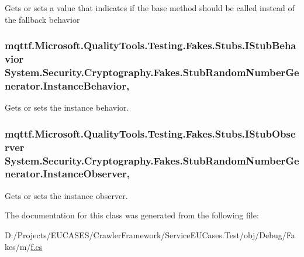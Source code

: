 Gets or sets a value that indicates if the base method should be called instead of the fallback behavior

\hypertarget{class_system_1_1_security_1_1_cryptography_1_1_fakes_1_1_stub_random_number_generator_aa175c81914f39e1bf90dbd521db4b320}{
\subsubsection[{Instance\-Behavior}]{\setlength{\rightskip}{0pt plus 5cm}mqttf.\-Microsoft.\-Quality\-Tools.\-Testing.\-Fakes.\-Stubs.\-I\-Stub\-Behavior System.\-Security.\-Cryptography.\-Fakes.\-Stub\-Random\-Number\-Generator.\-Instance\-Behavior\hspace{0.3cm}{\ttfamily [get]}, {\ttfamily [set]}}}\label{class_system_1_1_security_1_1_cryptography_1_1_fakes_1_1_stub_random_number_generator_aa175c81914f39e1bf90dbd521db4b320}


Gets or sets the instance behavior.

\hypertarget{class_system_1_1_security_1_1_cryptography_1_1_fakes_1_1_stub_random_number_generator_a30208c8b3600b89db80823166280736a}{
\subsubsection[{Instance\-Observer}]{\setlength{\rightskip}{0pt plus 5cm}mqttf.\-Microsoft.\-Quality\-Tools.\-Testing.\-Fakes.\-Stubs.\-I\-Stub\-Observer System.\-Security.\-Cryptography.\-Fakes.\-Stub\-Random\-Number\-Generator.\-Instance\-Observer\hspace{0.3cm}{\ttfamily [get]}, {\ttfamily [set]}}}\label{class_system_1_1_security_1_1_cryptography_1_1_fakes_1_1_stub_random_number_generator_a30208c8b3600b89db80823166280736a}


Gets or sets the instance observer.



The documentation for this class was generated from the following file\-:\begin{DoxyCompactItemize}
\item 
D\-:/\-Projects/\-E\-U\-C\-A\-S\-E\-S/\-Crawler\-Framework/\-Service\-E\-U\-Cases.\-Test/obj/\-Debug/\-Fakes/m/\hyperlink{m_2f_8cs}{f.\-cs}\end{DoxyCompactItemize}
